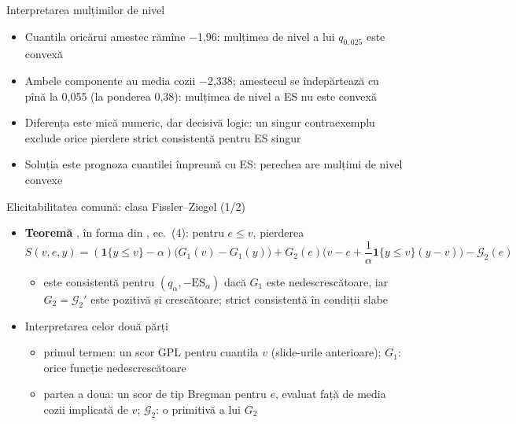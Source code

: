 \begin{frame}{Interpretarea mulțimilor de nivel}
\itemsize{\small}
\begin{itemize}
    \item Cuantila oricărui amestec rămîne \ensuremath{-}1{,}96: mulțimea de nivel a lui $q_{0{,}025}$ este convexă
    \item Ambele componente au media cozii \ensuremath{-}2{,}338; amestecul se îndepărtează cu pînă la 0{,}055 (la ponderea 0{,}38): mulțimea de nivel a ES nu este convexă
    \item Diferența este mică numeric, dar decisivă logic: un singur contraexemplu exclude orice pierdere strict consistentă pentru ES singur
    \item Soluția este prognoza cuantilei împreună cu ES: perechea are mulțimi de nivel convexe
\end{itemize}
\end{frame}

\begin{frame}{Elicitabilitatea comună: clasa Fissler--Ziegel (1/2)}
\itemsize{\small}
\begin{itemize}
    \item \textbf{Teoremă} , în forma din , ec.~(4): pentru $e \le v$, pierderea
    \[ S(v, e, y) = (\mathbf 1\{y \le v\} - \alpha)\big(G_1(v) - G_1(y)\big) + G_2(e)\Big(v - e + \frac{1}{\alpha}\mathbf 1\{y \le v\}(y - v)\Big) - \mathcal G_2(e) \]
    \begin{itemize}
        \item este consistentă pentru $(q_\alpha, -\mathrm{ES}_\alpha)$ dacă $G_1$ este nedescrescătoare, iar $G_2 = \mathcal G_2'$ este pozitivă și crescătoare; strict consistentă în condiții slabe
    \end{itemize}
    \item Interpretarea celor două părți
    \begin{itemize}
        \item primul termen: un scor GPL pentru cuantila $v$ (slide-urile anterioare); $G_1$: orice funcție nedescrescătoare
        \item partea a doua: un scor de tip Bregman pentru $e$, evaluat față de media cozii implicată de $v$; $\mathcal G_2$: o primitivă a lui $G_2$
    \end{itemize}
\end{itemize}
\end{frame}

